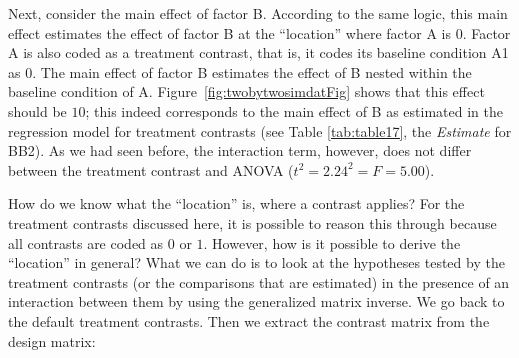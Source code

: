 \documentclass[12pt,]{krantz}
\newenvironment{Shaded}{\begin{snugshade}}{\end{snugshade}}
\newcommand{\DecValTok}[1]{\textcolor[rgb]{0.00,0.00,0.81}{#1}}
\newcommand{\KeywordTok}[1]{\textcolor[rgb]{0.13,0.29,0.53}{\textbf{#1}}}
\newcommand{\NormalTok}[1]{#1}
\newcommand{\OperatorTok}[1]{\textcolor[rgb]{0.81,0.36,0.00}{\textbf{#1}}}
\newcommand{\StringTok}[1]{\textcolor[rgb]{0.31,0.60,0.02}{#1}}
\theoremstyle{definition}
\theoremstyle{definition}
\theoremstyle{definition}
\theoremstyle{remark}
\begin{document}
Next, consider the main effect of factor B. According to the same logic, this main effect estimates the effect of factor B at the ``location'' where factor A is \(0\). Factor A is also coded as a treatment contrast, that is, it codes its baseline condition A1 as \(0\). The main effect of factor B estimates the effect of B nested within the baseline condition of A. Figure~\ref{fig:twobytwosimdatFig} shows that this effect should be \(10\); this indeed corresponds to the main effect of B as estimated in the regression model for treatment contrasts (see Table \ref{tab:table17}, the \emph{Estimate} for BB2). As we had seen before, the interaction term, however, does not differ between the treatment contrast and ANOVA (\(t^2 = 2.24^2 = F = 5.00\)).

How do we know what the ``location'' is, where a contrast applies? For the treatment contrasts discussed here, it is possible to reason this through because all contrasts are coded as \(0\) or \(1\). However, how is it possible to derive the ``location'' in general? What we can do is to look at the hypotheses tested by the treatment contrasts (or the comparisons that are estimated) in the presence of an interaction between them by using the generalized matrix inverse. We go back to the default treatment contrasts. Then we extract the contrast matrix from the design matrix:

\begin{Shaded}
\end{Shaded}
\end{document}
